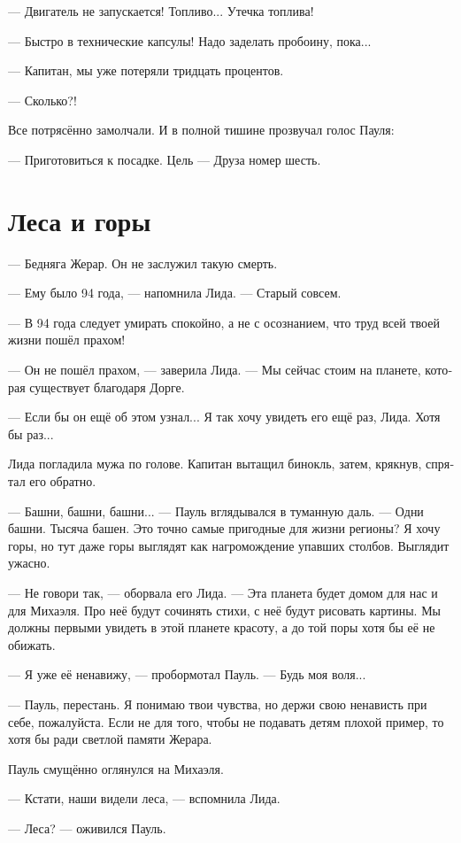 \documentclass[a4paper,12pt,fleqn]{book}\usepackage{cooltooltips}\usepackage{polyglossia}\setdefaultlanguage[babelshorthands=true]{russian}\setotherlanguage{english}\defaultfontfeatures{Ligatures=TeX,Mapping=tex-text} \usepackage{xcolor}\definecolor{lightgray}{HTML}{bbbbbb}\color{lightgray}\newcommand{\ml}[3]{\textenglish{\textcolor{black}{#3}}}
\begin{document}
--- Двигатель не запускается!
Топливо...
Утечка топлива!

--- Быстро в технические капсулы!
Надо заделать пробоину, пока...

--- Капитан, мы уже потеряли тридцать процентов.

--- Сколько?!

Все потрясённо замолчали.
И в полной тишине прозвучал голос Пауля:

--- Приготовиться к посадке.
Цель --- Друза номер шесть.

\section{Леса и горы}

--- Бедняга Жерар.
Он не заслужил такую смерть.

--- Ему было 94 года, --- напомнила Лида.
--- Старый совсем.

--- В 94 года следует умирать спокойно, а не с осознанием, что труд всей твоей жизни пошёл прахом!

--- Он не пошёл прахом, --- заверила Лида.
--- Мы сейчас стоим на планете, которая существует благодаря Дорге.

--- Если бы он ещё об этом узнал...
Я так хочу увидеть его ещё раз, Лида.
Хотя бы раз...

Лида погладила мужа по голове.
Капитан вытащил бинокль, затем, крякнув, спрятал его обратно.

--- Башни, башни, башни... --- Пауль вглядывался в туманную даль.
--- Одни башни.
Тысяча башен.
Это точно самые пригодные для жизни регионы?
Я хочу горы, но тут даже горы выглядят как нагромождение упавших столбов.
Выглядит ужасно.

--- Не говори так, --- оборвала его Лида.
--- Эта планета будет домом для нас и для Михаэля.
Про неё будут сочинять стихи, с неё будут рисовать картины.
Мы должны первыми увидеть в этой планете красоту, а до той поры хотя бы её не обижать.

--- Я уже её ненавижу, --- пробормотал Пауль.
--- Будь моя воля...

--- Пауль, перестань.
Я понимаю твои чувства, но держи свою ненависть при себе, пожалуйста.
Если не для того, чтобы не подавать детям плохой пример, то хотя бы ради светлой памяти Жерара.

Пауль смущённо оглянулся на Михаэля.

--- Кстати, наши видели леса, --- вспомнила Лида.

--- Леса? --- оживился Пауль.
\end{document}
